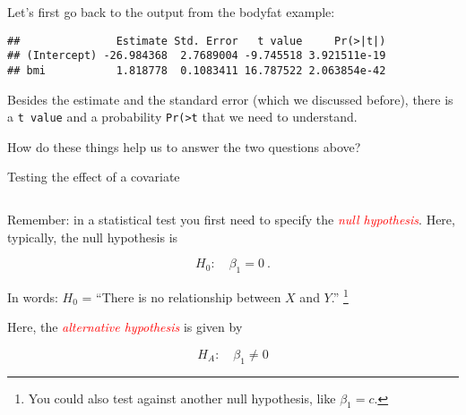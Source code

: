 \documentclass[10pt,ignorenonframetext,]{beamer}
\newenvironment{Shaded}{\begin{snugshade}}{\end{snugshade}}
\newcommand{\KeywordTok}[1]{\textcolor[rgb]{0.13,0.29,0.53}{\textbf{#1}}}
\newcommand{\NormalTok}[1]{#1}
\newcommand{\OperatorTok}[1]{\textcolor[rgb]{0.81,0.36,0.00}{\textbf{#1}}}
\begin{document}
\begin{frame}[fragile]

Let's first go back to the output from the bodyfat example:

\vspace{2mm}

\scriptsize

\begin{Shaded}
\end{Shaded}

\begin{verbatim}
##               Estimate Std. Error   t value     Pr(>|t|)
## (Intercept) -26.984368  2.7689004 -9.745518 3.921511e-19
## bmi           1.818778  0.1083411 16.787522 2.063854e-42
\end{verbatim}

\vspace{2mm}

\normalsize

Besides the estimate and the standard error (which we discussed before),
there is a \texttt{t\ value} and a probability
\texttt{Pr(\textgreater{}\textbar{}t\textbar{}} that we need to
understand.

How do these things help us to answer the two questions above?

\end{frame}

\begin{frame}

\begin{block}{Testing the effect of a covariate}

\(~\)

Remember: in a statistical test you first need to specify the
\emph{\textcolor{red}{null hypothesis}}. Here, typically, the null
hypothesis is

\[H_0: \quad \beta_1 =   0  \ .\]

In words: \(H_0\) = ``There is no relationship between \(X\) and
\(Y\).''
\footnote{You could also test against another null hypothesis, like $\beta_1=c$.}

\vspace{6mm}

Here, the \emph{\textcolor{red}{alternative hypothesis}} is given by
\(~\)

\[H_A: \quad \beta_1 \neq  0  \]

\end{block}

\end{frame}
\end{document}
